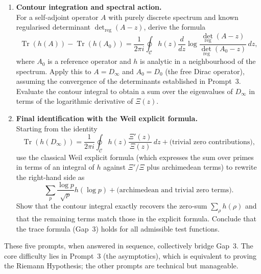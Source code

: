 \documentclass[12pt,a4paper]{article}
\begin{document}
\begin{enumerate}[leftmargin=*,label=\textbf{Prompt \arabic*:},ref=Prompt \arabic*]
\item \textbf{Contour integration and spectral action.}\\
For a self‑adjoint operator \(A\) with purely discrete spectrum and known regularised determinant \(\det_{\text{reg}}(A - z)\), derive the formula
\[
\operatorname{Tr}(h(A)) - \operatorname{Tr}(h(A_0)) = \frac{1}{2\pi i} \oint_{\mathcal{C}} h(z) \frac{d}{dz} \log \frac{\det_{\text{reg}}(A - z)}{\det_{\text{reg}}(A_0 - z)} \, dz,
\]
where \(A_0\) is a reference operator and \(h\) is analytic in a neighbourhood of the spectrum.
Apply this to \(A = D_\infty\) and \(A_0 = D_0\) (the free Dirac operator), assuming the convergence of the determinants established in Prompt~3.
Evaluate the contour integral to obtain a sum over the eigenvalues of \(D_\infty\) in terms of the logarithmic derivative of \(\Xi(z)\).

\item \textbf{Final identification with the Weil explicit formula.}\\
Starting from the identity
\[
\operatorname{Tr}(h(D_\infty)) = \frac{1}{2\pi i} \oint_{\mathcal{C}} h(z) \frac{\Xi'(z)}{\Xi(z)} \, dz + \text{(trivial zero contributions)},
\]
use the classical Weil explicit formula (which expresses the sum over primes in terms of an integral of \(h\) against \(\Xi'/\Xi\) plus archimedean terms) to rewrite the right‑hand side as
\[
\sum_{p} \frac{\log p}{\sqrt{p}} h(\log p) + \text{(archimedean and trivial zero terms)}.
\]
Show that the contour integral exactly recovers the zero‑sum \(\sum_{\rho} h(\rho)\) and that the remaining terms match those in the explicit formula.
Conclude that the trace formula (Gap~3) holds for all admissible test functions.

\end{enumerate}

These five prompts, when answered in sequence, collectively bridge Gap~3.
The core difficulty lies in Prompt~3 (the asymptotics), which is equivalent to proving the Riemann Hypothesis; the other prompts are technical but manageable.
\end{document}
